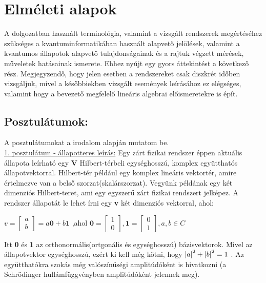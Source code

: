 





\section{Elméleti alapok}

A dolgozatban használt terminológia, valamint a vizsgált rendszerek megértéséhez szükséges a kvantuminformatikában használt alapvető jelölések, valamint a kvantumos állapotok alapvető tulajdonságainak és a rajtuk végzett mérések, műveletek hatásainak ismerete. Ehhez nyújt egy gyors áttekintést a következő rész. Megjegyzendő, hogy jelen esetben a rendszereket csak diszkrét időben vizsgáljuk, mivel a későbbiekben vizsgált események leírásához ez elégséges, valamint hogy a bevezető megfelelő lineáris algebrai előismeretekre is épít.

\subsection{Posztulátumok:} 
A posztulátumokat a \cite{kvantkonyv1} irodalom alapján mutatom be.\\

\underline{1. posztulátum - állapotteres leírás:} Egy zárt fizikai rendszer éppen aktuális állapota leírható egy \textbf{V} Hilbert-térbeli egységhosszú, komplex együtthatós állapotvektorral. Hilbert-tér például egy komplex lineáris vektortér, amire értelmezve van a belső szorzat(skalárszorzat). 
Vegyünk példának egy két dimenziós Hilbert-teret, ami egy egyszerű zárt fizikai rendszert jelképez. A rendszer állapotát le lehet írni egy \textbf{v} két dimenziós vektorral, ahol:\\
\begin{center}
$ v= \begin{bmatrix} a\\b \end{bmatrix} = a\textbf{0}+ b\textbf{1} $ ,ahol 
$\textbf{0}=\begin{bmatrix} 1\\0 \end{bmatrix} , \textbf{1}=\begin{bmatrix} 0\\1 \end{bmatrix} ,   a,b \in C$
\end{center}
Itt \textbf{0} és \textbf{1} az orthonormális(ortgonális és egységhosszú) bázisvektorok. Mivel az állapotvektor egységhosszú, ezért ki kell még kötni, hogy 
$\abs{a}^2+\abs{b}^2 =1$ . Az együtthatókra szokás még valószínűségi amplitúdóként is hivatkozni (a Schrödinger hullámfüggvényben amplitúdóként jelennek meg).

